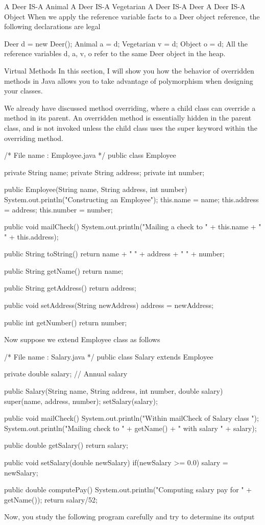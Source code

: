 A Deer IS-A Animal
A Deer IS-A Vegetarian
A Deer IS-A Deer
A Deer IS-A Object
When we apply the reference variable facts to a Deer object reference, the following declarations are legal

Deer d = new Deer();
Animal a = d;
Vegetarian v = d;
Object o = d;
All the reference variables d, a, v, o refer to the same Deer object in the heap.

Virtual Methods
In this section, I will show you how the behavior of overridden methods in Java allows you to take advantage of polymorphism when designing your classes.

We already have discussed method overriding, where a child class can override a method in its parent. An overridden method is essentially hidden in the parent class, and is not invoked unless the child class uses the super keyword within the overriding method.

/* File name : Employee.java */
public class Employee {
   private String name;
   private String address;
   private int number;

   public Employee(String name, String address, int number) {
      System.out.println("Constructing an Employee");
      this.name = name;
      this.address = address;
      this.number = number;
   }

   public void mailCheck() {
      System.out.println("Mailing a check to " + this.name + " " + this.address);
   }

   public String toString() {
      return name + " " + address + " " + number;
   }

   public String getName() {
      return name;
   }

   public String getAddress() {
      return address;
   }

   public void setAddress(String newAddress) {
      address = newAddress;
   }

   public int getNumber() {
      return number;
   }
}
Now suppose we extend Employee class as follows

/* File name : Salary.java */
public class Salary extends Employee {
   private double salary; // Annual salary

   public Salary(String name, String address, int number, double salary) {
      super(name, address, number);
      setSalary(salary);
   }

   public void mailCheck() {
      System.out.println("Within mailCheck of Salary class ");
      System.out.println("Mailing check to " + getName()
      + " with salary " + salary);
   }

   public double getSalary() {
      return salary;
   }

   public void setSalary(double newSalary) {
      if(newSalary >= 0.0) {
         salary = newSalary;
      }
   }

   public double computePay() {
      System.out.println("Computing salary pay for " + getName());
      return salary/52;
   }
}
Now, you study the following program carefully and try to determine its output

